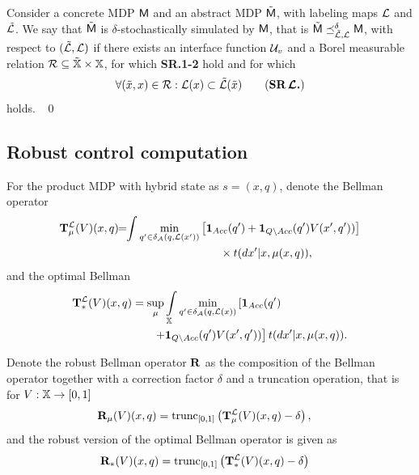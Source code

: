 \documentclass{ifacconf}
\newcommand{\red}[1]{{\color{red} #1}}
\begin{document}
\begin{definition}\label{def:apbsim}
Consider a concrete MDP $\mathsf{M}$ and an abstract  MDP $\tilde{\mathsf{M}}$, with labeling maps $\mathcal{L}$ and  $\tilde{\mathcal{L}}$.   
We say that	$\tilde{\mathsf{M}}$ is $\delta$-stochastically simulated by $\mathsf{M}$, that is $\tilde{\mathsf{M}}\preceq^{\delta}_{\tilde{\mathcal{L}},\mathcal{L}}\mathsf{M}$, with respect to $(\tilde{\mathcal{L}},\mathcal{L})$  if there exists an interface function $\mathcal{U}_{v}$ and
	a Borel measurable relation $\mathcal{R}\subseteq \tilde {{\mathbb{X}}}\times {\mathbb{X}}$, for which \textbf{SR.1-2} hold and for which 	\begin{equation}
	  \forall (\tilde x,x)\in \rel:  \Labset(x)\subset \tilde{\Labset}(\tilde x)
\tag{\textbf{SR$\,\boldsymbol{\CA{L}}$.}}
	\end{equation} 
holds. \hfill\mbox{ }\qed
\end{definition}





\subsection{Robust control computation}

\red{For the product MDP with hybrid state as $s=(x, q)$, denote the Bellman operator}
\begin{align}\label{eq:V_recopt_inf}
& \Bel_\pol^\Labset (V)(x,q) \!\!=\!\!\int%
\min_{q' \in \delta_\FSA(q, \Labset( x'))}\left[\mathbf 1_{Acc}(q')+  \mathbf 1_{Q\setminus Acc}(q')V( x',q'))\right]\notag\\&\hspace{5cm}\hfill \times{\tr}(d x'|x,\pol(x,q)),
\end{align}
and the optimal Bellman 
\begin{align}\label{eq:V_recopt_inf}
& \Bel_\ast^\Labset (V)(x,q) =\sup_\pol\int_{\X}\min_{ q' \in \delta_\FSA(q, \Labset(\bar x))}\left[\mathbf 1_{Acc}( q')\right.\hspace{1.5cm}\\&\left.\hspace{2.5cm}+  \mathbf 1_{Q\setminus Acc}( q')V( x', q'))\right]\notag {\tr}(d x'
|x,\pol(x,q)).
\end{align}



Denote the robust Bellman operator ${\mathbf {R}}$ as the composition of the Bellman operator together with a correction factor $\delta$ and  a truncation operation, that is for $V:{\mathbb{X}}\rightarrow [0,1]$
\begin{align}\label{eq:V_recopt_inf}
& {\mathbf {R}}_{\mu} (V)(x,q) = \mathop{\mathrm{trunc}}\nolimits_{[0,1]}\left({\mathbf {T}}_{\mu}^{\mathcal{L}} (V)(x,q)-\delta\right),
\end{align}
and the robust version of the optimal Bellman operator is given as 
\begin{align}\label{eq:V_recopt_inf}
& {\mathbf {R}}_\ast (V)(x,q)= \mathop{\mathrm{trunc}}\nolimits_{[0,1]}\left({\mathbf {T}}_\ast^{\mathcal{L}} (V)(x,q)-\delta\right)
\end{align}
\end{document}

